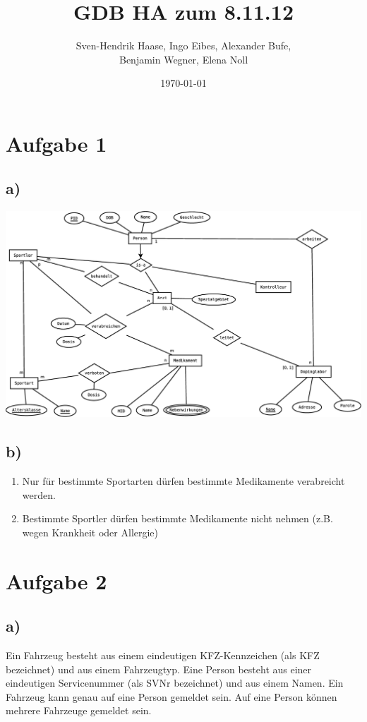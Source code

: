 \documentclass[12pt]{article}
\author{Sven-Hendrik Haase, Ingo Eibes, Alexander Bufe,\\Benjamin Wegner, Elena Noll}
\title{GDB HA zum 8.11.12}
\date{\today}
\begin{document}
\setcounter{secnumdepth}{0}
\maketitle

\section{Aufgabe 1}
\subsection{a)}
\includegraphics[scale=0.25]{Aufgabe2.eps}

\newpage
\subsection{b)}
\begin{enumerate}
\item Nur für bestimmte Sportarten dürfen bestimmte Medikamente verabreicht werden.
\item Bestimmte Sportler dürfen bestimmte Medikamente nicht nehmen (z.B. wegen Krankheit oder Allergie)
\end{enumerate}

\section{Aufgabe 2}
\subsection{a)}
Ein Fahrzeug besteht aus einem eindeutigen KFZ-Kennzeichen (als KFZ bezeichnet) und aus einem Fahrzeugtyp.
Eine Person besteht aus einer eindeutigen Servicenummer (als SVNr bezeichnet) und aus einem Namen.
Ein Fahrzeug kann genau auf eine Person gemeldet sein. Auf eine Person können mehrere Fahrzeuge gemeldet sein.
\end{document}
